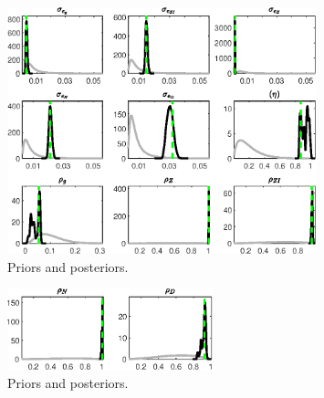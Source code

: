  
\begin{figure}[H]
\centering
\includegraphics[width=0.80\textwidth]{BRS_growth_res/Output/BRS_growth_res_PriorsAndPosteriors1}
\caption{Priors and posteriors.}\label{Fig:PriorsAndPosteriors:1}
\end{figure}
 
\begin{figure}[H]
\centering
\includegraphics[width=0.53\textwidth]{BRS_growth_res/Output/BRS_growth_res_PriorsAndPosteriors2}
\caption{Priors and posteriors.}\label{Fig:PriorsAndPosteriors:2}
\end{figure}
 
